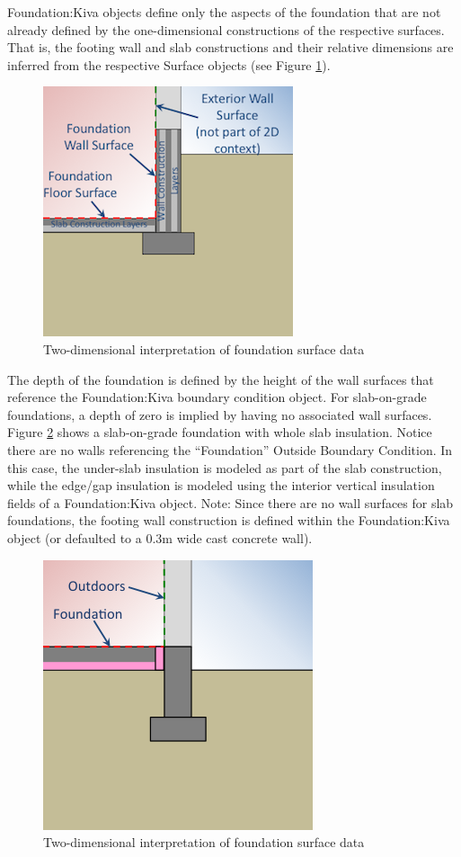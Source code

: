 Foundation:Kiva objects define only the aspects of the foundation that
are not already defined by the one-dimensional constructions of the
respective surfaces. That is, the footing wall and slab constructions
and their relative dimensions are inferred from the respective Surface
objects (see Figure \ref{fig:surf}).

\begin{figure}
\centering
\includegraphics{media/kiva-2d-surfaces.png}
\caption{Two-dimensional interpretation of foundation surface
data\label{fig:surf}}
\end{figure}

The depth of the foundation is defined by the height of the wall surfaces
that reference the Foundation:Kiva boundary condition object. For
slab-on-grade foundations, a depth of zero is implied by having no
associated wall surfaces. Figure \ref{fig:ws} shows a slab-on-grade
foundation with whole slab insulation. Notice there are no walls
referencing the ``Foundation'' Outside Boundary Condition. In this case,
the under-slab insulation is modeled as part of the slab construction,
while the edge/gap insulation is modeled using the interior vertical
insulation fields of a Foundation:Kiva object. Note: Since there are no
wall surfaces for slab foundations, the footing wall construction is
defined within the Foundation:Kiva object (or defaulted to a 0.3m wide
cast concrete wall).

\begin{figure}
\centering
\includegraphics{media/kiva-2d-whole-slab.png}
\caption{Two-dimensional interpretation of foundation surface
data\label{fig:ws}}
\end{figure}

